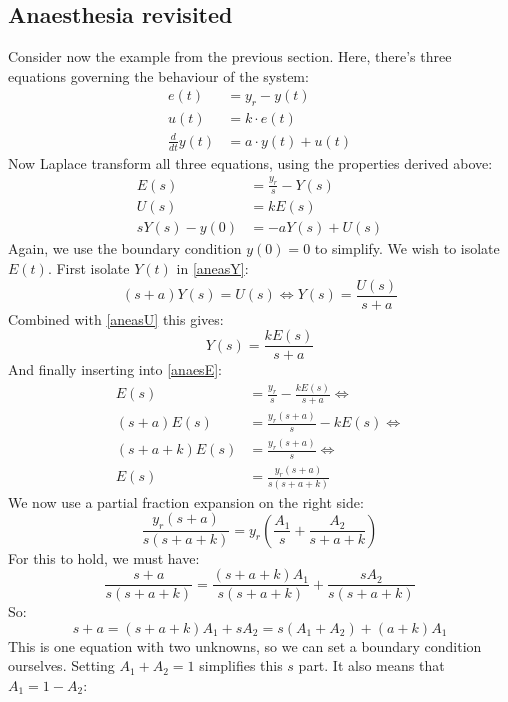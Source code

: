 \documentclass[12pt, a4paper]{article}
\numberwithin{equation}{section}
\begin{document}
\subsection{Anaesthesia revisited}
Consider now the example from the previous section. Here, there's three equations governing the behaviour of the system:
\begin{align}
e(t)&=y_r-y(t)\\
u(t)&=k\cdot e(t)\\
\frac{d}{dt}y(t)&=a\cdot y(t)+u(t)
\end{align}
Now Laplace transform all three equations, using the properties derived above:
\begin{align}
E(s)&=\frac{y_r}{s}-Y(s)\label{anaesE}\\
U(s)&=k E(s)\label{aneasU}\\
s Y(s)-y(0)&=-a Y(s)+U(s)\label{aneasY}
\end{align}
Again, we use the boundary condition $y(0)=0$ to simplify. We wish to isolate $E(t)$. First isolate $Y(t)$ in \ref{aneasY}:
\begin{equation}
(s+a)Y(s)=U(s)\Leftrightarrow Y(s)=\frac{U(s)}{s+a}
\end{equation}
Combined with \ref{aneasU} this gives:
\begin{equation}
Y(s)=\frac{k E(s)}{s+a}
\end{equation}
And finally inserting into \ref{anaesE}:
\begin{align}
E(s)&=\frac{y_r}{s}-\frac{k E(s)}{s+a}\Leftrightarrow\\
(s+a)E(s)&=\frac{y_r(s+a)}{s}-k E(s)\Leftrightarrow\\
(s+a+k)E(s)&=\frac{y_r(s+a)}{s}\Leftrightarrow\\
E(s)&=\frac{y_r(s+a)}{s(s+a+k)}
\end{align}
We now use a partial fraction expansion on the right side:
\begin{equation}
\frac{y_r(s+a)}{s(s+a+k)}=y_r\left(\frac{A_1}{s}+\frac{A_2}{s+a+k}\right)
\end{equation}
For this to hold, we must have:
\begin{equation}
\frac{s+a}{s(s+a+k)}=\frac{(s+a+k)A_1}{s(s+a+k)}+\frac{s A_2}{s(s+a+k)}
\end{equation}
So:
\begin{equation}
s+a=(s+a+k)A_1+sA_2=s(A_1+A_2)+(a+k)A_1
\end{equation}
This is one equation with two unknowns, so we can set a boundary condition ourselves. Setting $A_1+A_2=1$ simplifies this $s$ part. It also means that $A_1=1-A_2$:
\end{document}

